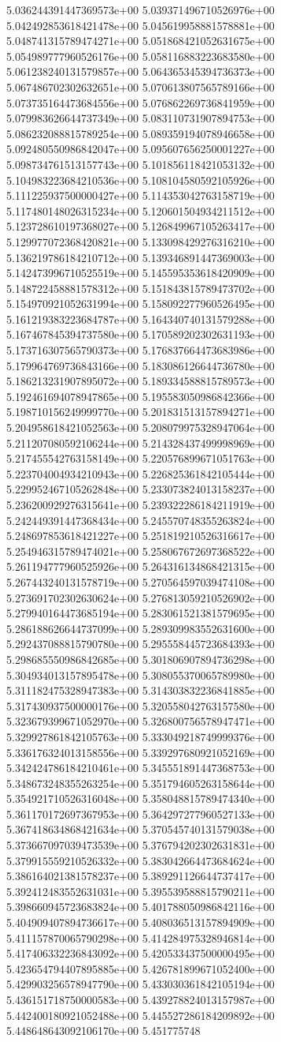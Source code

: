 5.036244391447369573e+00	5.039371496710526976e+00	5.042492853618421478e+00	5.045619958881578881e+00	5.048741315789474271e+00	5.051868421052631675e+00	5.054989777960526176e+00	5.058116883223683580e+00	5.061238240131579857e+00	5.064365345394736373e+00	5.067486702302632651e+00	5.070613807565789166e+00	5.073735164473684556e+00	5.076862269736841959e+00	5.079983626644737349e+00	5.083110731907894753e+00	5.086232088815789254e+00	5.089359194078946658e+00	5.092480550986842047e+00	5.095607656250001227e+00	5.098734761513157743e+00	5.101856118421053132e+00	5.104983223684210536e+00	5.108104580592105926e+00	5.111225937500000427e+00	5.114353042763158719e+00	5.117480148026315234e+00	5.120601504934211512e+00	5.123728610197368027e+00	5.126849967105263417e+00	5.129977072368420821e+00	5.133098429276316210e+00	5.136219786184210712e+00	5.139346891447369003e+00	5.142473996710525519e+00	5.145595353618420909e+00	5.148722458881578312e+00	5.151843815789473702e+00	5.154970921052631994e+00	5.158092277960526495e+00	5.161219383223684787e+00	5.164340740131579288e+00	5.167467845394737580e+00	5.170589202302631193e+00	5.173716307565790373e+00	5.176837664473683986e+00	5.179964769736843166e+00	5.183086126644736780e+00	5.186213231907895072e+00	5.189334588815789573e+00	5.192461694078947865e+00	5.195583050986842366e+00	5.198710156249999770e+00	5.201831513157894271e+00	5.204958618421052563e+00	5.208079975328947064e+00	5.211207080592106244e+00	5.214328437499998969e+00	5.217455542763158149e+00	5.220576899671051763e+00	5.223704004934210943e+00	5.226825361842105444e+00	5.229952467105262848e+00	5.233073824013158237e+00	5.236200929276315641e+00	5.239322286184211919e+00	5.242449391447368434e+00	5.245570748355263824e+00	5.248697853618421227e+00	5.251819210526316617e+00	5.254946315789474021e+00	5.258067672697368522e+00	5.261194777960525926e+00	5.264316134868421315e+00	5.267443240131578719e+00	5.270564597039474108e+00	5.273691702302630624e+00	5.276813059210526902e+00	5.279940164473685194e+00	5.283061521381579695e+00	5.286188626644737099e+00	5.289309983552631600e+00	5.292437088815790780e+00	5.295558445723684393e+00	5.298685550986842685e+00	5.301806907894736298e+00	5.304934013157895478e+00	5.308055370065789980e+00	5.311182475328947383e+00	5.314303832236841885e+00	5.317430937500000176e+00	5.320558042763157580e+00	5.323679399671052970e+00	5.326800756578947471e+00	5.329927861842105763e+00	5.333049218749999376e+00	5.336176324013158556e+00	5.339297680921052169e+00	5.342424786184210461e+00	5.345551891447368753e+00	5.348673248355263254e+00	5.351794605263158644e+00	5.354921710526316048e+00	5.358048815789474340e+00	5.361170172697367953e+00	5.364297277960527133e+00	5.367418634868421634e+00	5.370545740131579038e+00	5.373667097039473539e+00	5.376794202302631831e+00	5.379915559210526332e+00	5.383042664473684624e+00	5.386164021381578237e+00	5.389291126644737417e+00	5.392412483552631031e+00	5.395539588815790211e+00	5.398660945723683824e+00	5.401788050986842116e+00	5.404909407894736617e+00	5.408036513157894909e+00	5.411157870065790298e+00	5.414284975328946814e+00	5.417406332236843092e+00	5.420533437500000495e+00	5.423654794407895885e+00	5.426781899671052400e+00	5.429903256578947790e+00	5.433030361842105194e+00	5.436151718750000583e+00	5.439278824013157987e+00	5.442400180921052488e+00	5.445527286184209892e+00	5.448648643092106170e+00	5.451775748